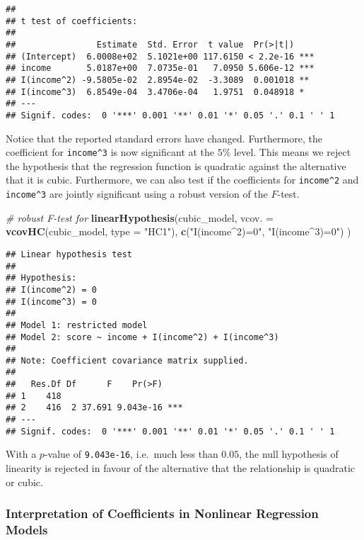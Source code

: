\documentclass[]{book}
\newenvironment{Shaded}{\begin{snugshade}}{\end{snugshade}}
\newcommand{\KeywordTok}[1]{\textcolor[rgb]{0.13,0.29,0.53}{\textbf{#1}}}
\newcommand{\DataTypeTok}[1]{\textcolor[rgb]{0.13,0.29,0.53}{#1}}
\newcommand{\StringTok}[1]{\textcolor[rgb]{0.31,0.60,0.02}{#1}}
\newcommand{\CommentTok}[1]{\textcolor[rgb]{0.56,0.35,0.01}{\textit{#1}}}
\newcommand{\NormalTok}[1]{#1}
\theoremstyle{definition}
\theoremstyle{definition}
\theoremstyle{definition}
\theoremstyle{remark}
\begin{document}
\begin{verbatim}
## 
## t test of coefficients:
## 
##                Estimate  Std. Error  t value  Pr(>|t|)    
## (Intercept)  6.0008e+02  5.1021e+00 117.6150 < 2.2e-16 ***
## income       5.0187e+00  7.0735e-01   7.0950 5.606e-12 ***
## I(income^2) -9.5805e-02  2.8954e-02  -3.3089  0.001018 ** 
## I(income^3)  6.8549e-04  3.4706e-04   1.9751  0.048918 *  
## ---
## Signif. codes:  0 '***' 0.001 '**' 0.01 '*' 0.05 '.' 0.1 ' ' 1
\end{verbatim}

Notice that the reported standard errors have changed. Furthermore, the
coefficient for \texttt{income\^{}3} is now significant at the \(5\%\)
level. This means we reject the hypothesis that the regression function
is quadratic against the alternative that it is cubic. Furthermore, we
can also test if the coefficients for \texttt{income\^{}2} and
\texttt{income\^{}3} are jointly significant using a robust version of
the \(F\)-test.

\begin{Shaded}
\begin{Highlighting}[]
\CommentTok{# robust F-test for }
\KeywordTok{linearHypothesis}\NormalTok{(cubic_model, }
                 \DataTypeTok{vcov. =} \KeywordTok{vcovHC}\NormalTok{(cubic_model, }\DataTypeTok{type =} \StringTok{"HC1"}\NormalTok{),}
                 \KeywordTok{c}\NormalTok{(}\StringTok{"I(income^2)=0"}\NormalTok{, }\StringTok{"I(income^3)=0"}\NormalTok{)}
\NormalTok{                 )}
\end{Highlighting}
\end{Shaded}

\begin{verbatim}
## Linear hypothesis test
## 
## Hypothesis:
## I(income^2) = 0
## I(income^3) = 0
## 
## Model 1: restricted model
## Model 2: score ~ income + I(income^2) + I(income^3)
## 
## Note: Coefficient covariance matrix supplied.
## 
##   Res.Df Df      F    Pr(>F)    
## 1    418                        
## 2    416  2 37.691 9.043e-16 ***
## ---
## Signif. codes:  0 '***' 0.001 '**' 0.01 '*' 0.05 '.' 0.1 ' ' 1
\end{verbatim}

With a \(p\)-value of \texttt{9.043e-16}, i.e.~much less than \(0.05\),
the null hypothesis of linearity is rejected in favour of the
alternative that the relationship is quadratic or cubic.

\subsubsection*{Interpretation of Coefficients in Nonlinear Regression
Models}\label{interpretation-of-coefficients-in-nonlinear-regression-models}
\end{document}
